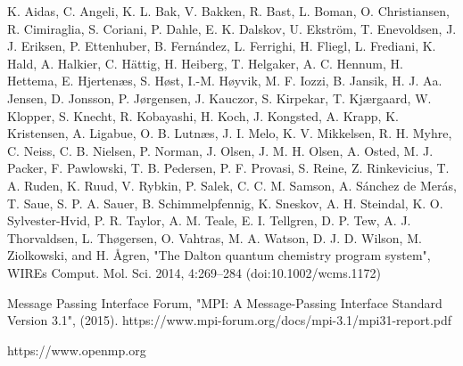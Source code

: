 \documentclass[%
 aip,
 amsmath,amssymb,
 reprint,%
]{revtex4-1}
\begin{document}
\begin{thebibliography}{}
 K. Aidas, C. Angeli, K. L. Bak, V. Bakken, R. Bast, L. Boman, O. Christiansen, R. Cimiraglia, S. Coriani, P. Dahle, E. K. Dalskov, U. Ekström, T. Enevoldsen, J. J. Eriksen, P. Ettenhuber, B. Fernández, L. Ferrighi, H. Fliegl, L. Frediani, K. Hald, A. Halkier, C. Hättig, H. Heiberg, T. Helgaker, A. C. Hennum, H. Hettema, E. Hjertenæs, S. Høst, I.-M. Høyvik, M. F. Iozzi, B. Jansik, H. J. Aa. Jensen, D. Jonsson, P. Jørgensen, J. Kauczor, S. Kirpekar, T. Kjærgaard, W. Klopper, S. Knecht, R. Kobayashi, H. Koch, J. Kongsted, A. Krapp, K. Kristensen, A. Ligabue, O. B. Lutnæs, J. I. Melo, K. V. Mikkelsen, R. H. Myhre, C. Neiss, C. B. Nielsen, P. Norman, J. Olsen, J. M. H. Olsen, A. Osted, M. J. Packer, F. Pawlowski, T. B. Pedersen, P. F. Provasi, S. Reine, Z. Rinkevicius, T. A. Ruden, K. Ruud, V. Rybkin, P. Salek, C. C. M. Samson, A. Sánchez de Merás, T. Saue, S. P. A. Sauer, B. Schimmelpfennig, K. Sneskov, A. H. Steindal, K. O. Sylvester-Hvid, P. R. Taylor, A. M. Teale, E. I. Tellgren, D. P. Tew, A. J. Thorvaldsen, L. Thøgersen, O. Vahtras, M. A. Watson, D. J. D. Wilson, M. Ziolkowski, and H. Ågren, "The Dalton quantum chemistry program system", WIREs Comput. Mol. Sci. 2014, 4:269–284 (doi:10.1002/wcms.1172)

Message Passing Interface Forum, "MPI: A Message-Passing Interface Standard Version 3.1", (2015). https://www.mpi-forum.org/docs/mpi-3.1/mpi31-report.pdf

 https://www.openmp.org

\end{thebibliography}
\end{document}
